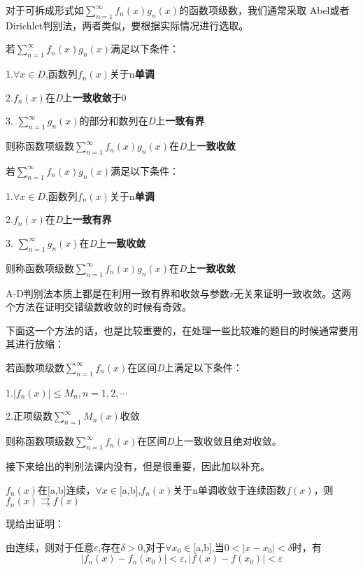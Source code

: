 \documentclass[lang=cn,10pt]{elegantbook}
\begin{document}
对于可拆成形式如$\sum_{n=1}^{\infty } f_{n}(x)g_{n}(x)$的函数项级数，我们通常采取
Abel或者Dirichlet判别法，两者类似，要根据实际情况进行选取。
\begin{theorem}[Dirichlet判别法]
	若$\sum_{n=1}^{\infty } f_{n}(x)g_{n}(x)$满足以下条件：
	
	1.$\forall x \in D$,函数列${f_{n}(x)}$关于n\textbf{单调}
	
	2.${f_{n}(x)}$在\textit{D}上\textbf{一致收敛}于0
	
	3. $\sum_{n=1}^{\infty } g_{n}(x)$的部分和数列在\textit{D}上\textbf{一致有界}
	
	则称函数项级数$\sum_{n=1}^{\infty } f_{n}(x)g_{n}(x)$在\textit{D}上\textbf{一致收敛}
\end{theorem}
\begin{theorem}[Abel判别法]
	若$\sum_{n=1}^{\infty } f_{n}(x)g_{n}(x)$满足以下条件：
	
	1.$\forall x \in D$,函数列${f_{n}(x)}$关于n\textbf{单调}
	
	2.${f_{n}(x)}$在\textit{D}上\textbf{一致有界}
	
	3. $\sum_{n=1}^{\infty } g_{n}(x)$在\textit{D}上\textbf{一致收敛}
	
	则称函数项级数$\sum_{n=1}^{\infty } f_{n}(x)g_{n}(x)$在\textit{D}上\textbf{一致收敛}
\end{theorem}

A-D判别法本质上都是在利用一致有界和收敛与参数\textit{x}无关来证明一致收敛。这两个方法在证明交错级数收敛的时候有奇效。

下面这一个方法的话，也是比较重要的，在处理一些比较难的题目的时候通常要用其进行放缩：
\begin{theorem}[Weierstrass判别法]
	若函数项级数$\sum_{n=1}^{\infty } f_{n}(x)$在区间\textit{D}上满足以下条件：
	
	1.$|f_{n}(x)|\le M_{n} ,n=1,2,\cdots$
	
	2.正项级数$\sum_{n=1}^{\infty } M_{n}(x)$收敛
	
	则称函数项级数$\sum_{n=1}^{\infty } f_{n}(x)$在区间\textit{D}上一致收敛且绝对收敛。
\end{theorem}

接下来给出的判别法课内没有，但是很重要，因此加以补充。
\begin{theorem}[Dini判别法]
	$f_{n}(x)$在[a,b]连续，$\forall x\in$[a,b],$f_{n}(x)$关于n单调收敛于连续函数$f(x)$，则$f_{n}(x) \rightrightarrows f(x)$
\end{theorem}

现给出证明：

由连续，则对于任意$\varepsilon$,存在$\delta >0$,对于$\forall x_{0}\in$[a,b],当$0<|x-x_{0}|<\delta$时，有
\begin{equation*}
	|f_{n}(x)-f_{n}(x_{0})|	<\varepsilon,
	|f(x)-f(x_{0})|	<\varepsilon
\end{equation*}
\end{document}
